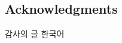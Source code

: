 

\begin{CJK}{UTF8}{}
\begin{Korean}

\chapter*{Acknowledgments}
{\fontsize{11pt}{18pt} \thispagestyle{empty}
 \selectfont

감사의 글 한국어

\bigskip


\thispagestyle{empty} }
\end{Korean}
\end{CJK}

